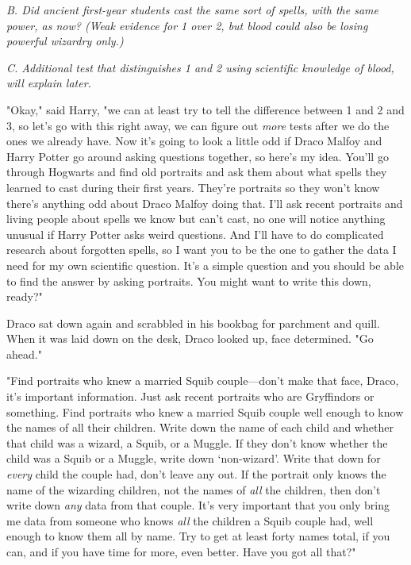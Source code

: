 \emph{B. Did ancient first-year students cast the same sort of spells, with the 
same power, as now? (Weak evidence for 1 over 2, but blood could also be losing 
powerful wizardry only.)}

\emph{C. Additional test that distinguishes 1 and 2 using scientific knowledge 
of blood, will explain later.}

"Okay," said Harry, "we can at least try to tell the difference between 1 and 2 
and 3, so let's go with this right away, we can figure out \emph{more} tests 
after we do the ones we already have. Now it's going to look a little odd if 
Draco Malfoy and Harry Potter go around asking questions together, so here's my 
idea. You'll go through Hogwarts and find old portraits and ask them about what 
spells they learned to cast during their first years. They're portraits so they 
won't know there's anything odd about Draco Malfoy doing that. I'll ask recent 
portraits and living people about spells we know but can't cast, no one will 
notice anything unusual if Harry Potter asks weird questions. And I'll have to 
do complicated research about forgotten spells, so I want you to be the one to 
gather the data I need for my own scientific question. It's a simple question 
and you should be able to find the answer by asking portraits. You might want 
to write this down, ready?"

Draco sat down again and scrabbled in his bookbag for parchment and quill. When 
it was laid down on the desk, Draco looked up, face determined. "Go ahead."

"Find portraits who knew a married Squib couple---don't make that face, Draco, 
it's important information. Just ask recent portraits who are Gryffindors or 
something. Find portraits who knew a married Squib couple well enough to know 
the names of all their children. Write down the name of each child and whether 
that child was a wizard, a Squib, or a Muggle. If they don't know whether the 
child was a Squib or a Muggle, write down `non-wizard'. Write that down for 
\emph{every} child the couple had, don't leave any out. If the portrait only 
knows the name of the wizarding children, not the names of \emph{all} the 
children, then don't write down \emph{any} data from that couple. It's very 
important that you only bring me data from someone who knows \emph{all} the 
children a Squib couple had, well enough to know them all by name. Try to get 
at least forty names total, if you can, and if you have time for more, even 
better. Have you got all that?"

